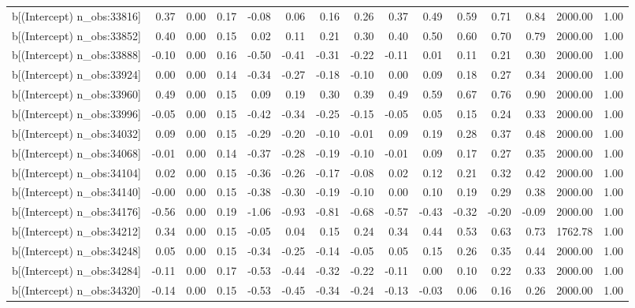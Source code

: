 \begin{table}[ht]
\begin{tabular}{rrrrrrrrrrrrrrr}
  b[(Intercept) n\_obs:33816] & 0.37 & 0.00 & 0.17 & -0.08 & 0.06 & 0.16 & 0.26 & 0.37 & 0.49 & 0.59 & 0.71 & 0.84 & 2000.00 & 1.00 \\ 
  b[(Intercept) n\_obs:33852] & 0.40 & 0.00 & 0.15 & 0.02 & 0.11 & 0.21 & 0.30 & 0.40 & 0.50 & 0.60 & 0.70 & 0.79 & 2000.00 & 1.00 \\ 
  b[(Intercept) n\_obs:33888] & -0.10 & 0.00 & 0.16 & -0.50 & -0.41 & -0.31 & -0.22 & -0.11 & 0.01 & 0.11 & 0.21 & 0.30 & 2000.00 & 1.00 \\ 
  b[(Intercept) n\_obs:33924] & 0.00 & 0.00 & 0.14 & -0.34 & -0.27 & -0.18 & -0.10 & 0.00 & 0.09 & 0.18 & 0.27 & 0.34 & 2000.00 & 1.00 \\ 
  b[(Intercept) n\_obs:33960] & 0.49 & 0.00 & 0.15 & 0.09 & 0.19 & 0.30 & 0.39 & 0.49 & 0.59 & 0.67 & 0.76 & 0.90 & 2000.00 & 1.00 \\ 
  b[(Intercept) n\_obs:33996] & -0.05 & 0.00 & 0.15 & -0.42 & -0.34 & -0.25 & -0.15 & -0.05 & 0.05 & 0.15 & 0.24 & 0.33 & 2000.00 & 1.00 \\ 
  b[(Intercept) n\_obs:34032] & 0.09 & 0.00 & 0.15 & -0.29 & -0.20 & -0.10 & -0.01 & 0.09 & 0.19 & 0.28 & 0.37 & 0.48 & 2000.00 & 1.00 \\ 
  b[(Intercept) n\_obs:34068] & -0.01 & 0.00 & 0.14 & -0.37 & -0.28 & -0.19 & -0.10 & -0.01 & 0.09 & 0.17 & 0.27 & 0.35 & 2000.00 & 1.00 \\ 
  b[(Intercept) n\_obs:34104] & 0.02 & 0.00 & 0.15 & -0.36 & -0.26 & -0.17 & -0.08 & 0.02 & 0.12 & 0.21 & 0.32 & 0.42 & 2000.00 & 1.00 \\ 
  b[(Intercept) n\_obs:34140] & -0.00 & 0.00 & 0.15 & -0.38 & -0.30 & -0.19 & -0.10 & 0.00 & 0.10 & 0.19 & 0.29 & 0.38 & 2000.00 & 1.00 \\ 
  b[(Intercept) n\_obs:34176] & -0.56 & 0.00 & 0.19 & -1.06 & -0.93 & -0.81 & -0.68 & -0.57 & -0.43 & -0.32 & -0.20 & -0.09 & 2000.00 & 1.00 \\ 
  b[(Intercept) n\_obs:34212] & 0.34 & 0.00 & 0.15 & -0.05 & 0.04 & 0.15 & 0.24 & 0.34 & 0.44 & 0.53 & 0.63 & 0.73 & 1762.78 & 1.00 \\ 
  b[(Intercept) n\_obs:34248] & 0.05 & 0.00 & 0.15 & -0.34 & -0.25 & -0.14 & -0.05 & 0.05 & 0.15 & 0.26 & 0.35 & 0.44 & 2000.00 & 1.00 \\ 
  b[(Intercept) n\_obs:34284] & -0.11 & 0.00 & 0.17 & -0.53 & -0.44 & -0.32 & -0.22 & -0.11 & 0.00 & 0.10 & 0.22 & 0.33 & 2000.00 & 1.00 \\ 
  b[(Intercept) n\_obs:34320] & -0.14 & 0.00 & 0.15 & -0.53 & -0.45 & -0.34 & -0.24 & -0.13 & -0.03 & 0.06 & 0.16 & 0.26 & 2000.00 & 1.00 \\ 

\end{tabular}
\end{table}

